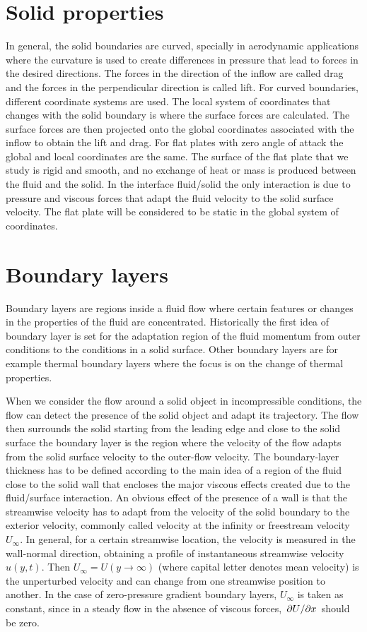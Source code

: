\section{Solid properties}
In general, the solid boundaries are curved, specially in aerodynamic applications where the curvature is used to create differences in pressure that lead to forces in the desired directions. The forces in the direction of the inflow are called drag and the forces in the perpendicular direction is called lift. For curved boundaries, different coordinate systems are used. The local system of coordinates that changes with the solid boundary is where the surface forces are calculated. The surface forces are then projected onto the global coordinates associated with the inflow to obtain the lift and drag.
For flat plates with zero angle of attack the global and local coordinates are the same.
The surface of the flat plate that we study is rigid and smooth, and no exchange of heat or mass is produced between the fluid and the solid. In the interface fluid/solid the only interaction is due to pressure and viscous forces that adapt the fluid velocity to the solid surface velocity.
The flat plate will be considered to be static in the global system of coordinates.


\section{Boundary layers}

Boundary layers are regions inside a fluid flow where certain features or changes in the properties of the fluid are concentrated. Historically the first idea of boundary layer is set for the adaptation region of the fluid momentum from outer conditions to the conditions in a solid surface.
Other boundary layers are for example thermal boundary layers where the focus is on the change of thermal properties.

When we consider the flow around a solid object in incompressible conditions, the flow can detect the presence of the solid object and adapt its trajectory. The flow then surrounds the solid starting from the leading edge and close to the solid surface the boundary layer is the region where the velocity of the flow adapts from the solid surface velocity to the outer-flow velocity. The boundary-layer thickness has to be defined according to the main idea of a region of the fluid close to the solid wall that encloses the major viscous effects created due to the fluid/surface interaction. An obvious effect of the presence of a wall is that the streamwise velocity has to adapt from the velocity of the solid boundary to the exterior velocity, commonly called velocity at the infinity or freestream velocity $U_{\infty}$. 
In general, for a certain streamwise location, the velocity is measured in the wall-normal direction, obtaining a profile of instantaneous streamwise velocity $u(y,t)$. Then $U_{\infty}=U(y\rightarrow \infty)$ (where capital letter denotes mean velocity) is the unperturbed velocity and can change from one streamwise position to another.
In the case of zero-pressure gradient boundary layers, $U_{\infty}$ is taken as constant, since in a steady flow in the absence of viscous forces, $\pdv{U}/{x}$ should be zero. 

